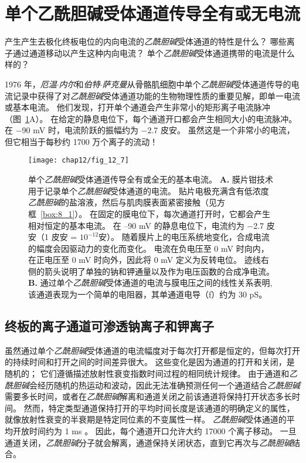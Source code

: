 \section{单个乙酰胆碱受体通道传导全有或无电流}

产生产生去极化终板电位的内向电流的\textit{乙酰胆碱}受体通道的特性是什么？
哪些离子通过通道移动以产生这种内向电流？
单个\textit{乙酰胆碱}受体通道携带的电流是什么样的？


1976 年，\textit{厄温$\cdot$内尔}和\textit{伯特$\cdot$萨克曼}从骨骼肌细胞中单个\textit{乙酰胆碱}受体通道传导的电流记录中获得了对\textit{乙酰胆碱}受体通道功能的生物物理性质的重要见解，即单一电流或基本电流。
他们发现，打开单个通道会产生非常小的矩形离子电流脉冲（图~\ref{fig:12_7}A）。
在给定的静息电位下，每个通道开口都会产生相同大小的电流脉冲。
在 −90 mV 时，电流阶跃的振幅约为 −2.7 皮安。 
虽然这是一个非常小的电流，但它相当于每秒约 1700 万个离子的流动！


\begin{figure}[htbp]
	\centering
	\texttt{[image: chap12/fig\_12\_7]}
	\caption{单个\textit{乙酰胆碱}受体通道传导全有或全无的基本电流。
		\textbf{A.} 膜片钳技术用于记录单个\textit{乙酰胆碱}受体通道的电流。
		贴片电极充满含有低浓度\textit{乙酰胆碱}的盐溶液，然后与肌肉膜表面紧密接触（见方框~\ref{box:8_1}）。
		在固定的膜电位下，每次通道打开时，它都会产生相对恒定的基本电流。
		在 –90 mV 的静息电位下，电流约为 −2.7 皮安（1 皮安 = $10^{-12}$安）。
		随着膜片上的电压系统地变化，合成电流的幅度会因驱动力的变化而变化。
		电流在负电压至 0 mV 时向内，在正电压至 0 mV 时向外，因此将 0 mV 定义为反转电位。
		迹线右侧的箭头说明了单独的钠和钾通量以及作为电压函数的合成净电流。
		\textbf{B.} 通过单个\textit{乙酰胆碱}受体通道的电流与膜电压之间的线性关系表明,该通道表现为一个简单的电阻器，其单通道电导（f）约为 30 pS。}
	\label{fig:12_7}
\end{figure}



\subsection{终板的离子通道可渗透钠离子和钾离子}

虽然通过单个\textit{乙酰胆碱}受体通道的电流幅度对于每次打开都是恒定的，但每次打开的持续时间和打开之间的时间差异很大。
这些变化是因为通道的打开和关闭，是随机的；
它们遵循描述放射性衰变指数时间过程的相同统计规律。 
由于通道和\textit{乙酰胆碱}会经历随机的热运动和波动，因此无法准确预测任何一个通道结合\textit{乙酰胆碱}需要多长时间，或者在\textit{乙酰胆碱}解离和通道关闭之前该通道将保持打开状态多长时间。
然而，特定类型通道保持打开的平均时间长度是该通道的明确定义的属性，就像放射性衰变的半衰期是特定同位素的不变属性一样。
\textit{乙酰胆碱}受体通道的平均开放时间约为 1 ms 。
因此，每个通道开口允许大约 17000 个离子移动。
一旦通道关闭，\textit{乙酰胆碱}分子就会解离，通道保持关闭状态，直到它再次与\textit{乙酰胆碱}结合。


